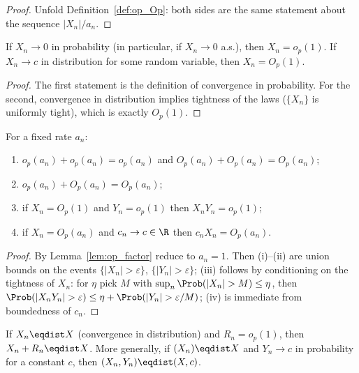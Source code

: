 \begin{proof}
Unfold Definition~\ref{def:op_Op}: both sides are the same statement about the
sequence $|X_n|/a_n$.
\end{proof}

\begin{lemma}\label{lem:op_of_tendsto}
If $X_n \to 0$ in probability (in particular, if $X_n \to 0$ a.s.), then
$X_n = o_p(1)$. If $X_n \to c$ in distribution for some random variable, then
$X_n = O_p(1)$.
\end{lemma}

\begin{proof}
The first statement is the definition of convergence in probability. For the
second, convergence in distribution implies tightness of the laws
($\{X_n\}$ is uniformly tight), which is exactly $O_p(1)$.
\end{proof}

\begin{lemma}\label{lem:op_arith}
\leanok
{}
For a fixed rate $a_n$:
\begin{enumerate}
  \item[(i)] $o_p(a_n) + o_p(a_n) = o_p(a_n)$ and $O_p(a_n) + O_p(a_n) = O_p(a_n)$;
  \item[(ii)] $o_p(a_n) + O_p(a_n) = O_p(a_n)$;
  \item[(iii)] if $X_n = O_p(1)$ and $Y_n = o_p(1)$ then $X_n Y_n = o_p(1)$;
  \item[(iv)] if $X_n = O_p(a_n)$ and $c_n \to c \in \R$ then $c_n X_n = O_p(a_n)$.
\end{enumerate}
\end{lemma}

\begin{proof}\leanok
{}
By Lemma~\ref{lem:op_factor} reduce to $a_n = 1$. Then (i)--(ii) are union bounds
on the events $\{|X_n| > \varepsilon\}$, $\{|Y_n| > \varepsilon\}$; (iii) follows
by conditioning on the tightness of $X_n$: for $\eta$ pick $M$ with
$\sup_n \Prob(|X_n|>M)\le\eta$, then $\Prob(|X_nY_n|>\varepsilon)\le\eta
+\Prob(|Y_n|>\varepsilon/M)$; (iv) is immediate from boundedness of $c_n$.
\end{proof}

\begin{lemma}\label{lem:op_slutsky}
If $X_n \eqdist X$ (convergence in distribution) and $R_n = o_p(1)$, then
$X_n + R_n \eqdist X$. More generally, if $(X_n) \eqdist X$ and $Y_n \to c$ in
probability for a constant $c$, then $(X_n, Y_n) \eqdist (X, c)$.
\end{lemma}

